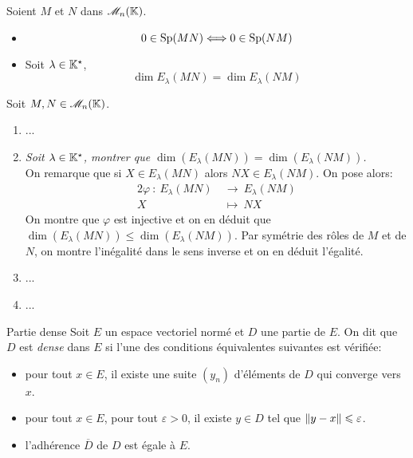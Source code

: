 \begin{prop}{}
    Soient $M$ et $N$ dans $\mathscr{M}_n(\mathbb{K})$.
    \begin{itemize}
        \item $$0 \in \mathrm{Sp}(MN) \Longleftrightarrow 0 \in \mathrm{Sp}(NM)$$
        \item Soit $\lambda \in \mathbb{K}^\star$,
        $$\dim E_\lambda(MN) = \dim E_\lambda(NM)$$
    \end{itemize}
\end{prop}

Soit $M, N \in \mathscr{M}_n(\mathbb{K})$. 
\begin{enumerate}
    \item ...
    \item \emph{Soit $\lambda \in \mathbb{K}^\star$, montrer que $\dim(E_\lambda (MN)) = \dim(E_\lambda (NM))$.} \\
    On remarque que si $X \in E_\lambda (MN)$ alors $NX \in E_\lambda (NM)$. On pose alors:
    \begin{alignat*}{2}
        \varphi\ :\ E_\lambda (MN)\ &\longrightarrow\ E_\lambda (NM)\\
        X\ &\longmapsto\ NX
    \end{alignat*}
    On montre que $\varphi$ est injective et on en déduit que $\dim(E_\lambda (MN)) \leqslant \dim(E_\lambda (NM))$. Par symétrie des rôles de $M$ et de $N$, on montre l'inégalité dans le sens inverse et on en déduit l'égalité.
    \item ...
    \item ...
\end{enumerate}

\begin{defi}{Partie dense}
    Soit $E$ un espace vectoriel normé et $D$ une partie de $E$. On dit que $D$ est \emph{dense} dans $E$ si l'une des conditions équivalentes suivantes est vérifiée:
    \begin{itemize}
        \item pour tout $x \in E$, il existe une suite $(y_n)$ d'éléments de $D$ qui converge vers $x$.
        \item pour tout $x \in E$, pour tout $\varepsilon > 0$, il existe $y \in D$ tel que $\Vert y - x \Vert \leqslant \varepsilon$.
        \item l'adhérence $\overline{D}$ de $D$ est égale à $E$.
    \end{itemize}
\end{defi}

